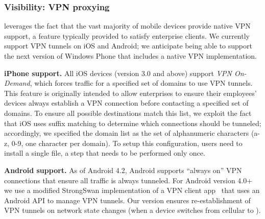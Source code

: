 %


\subsubsection{Visibility: VPN proxying}
\label{subsec:design_visibility}

\meddle leverages the fact that the vast majority of mobile devices provide native VPN support, a feature typically provided to satisfy enterprise clients. We currently support VPN tunnels on iOS and Android; we anticipate being able to support the next version of Windows Phone that includes a native VPN implementation.

\noindent\textbf{iPhone support.} 
All iOS devices (version 3.0 and above) support \textit{VPN On-Demand}, which forces traffic for a specified set of domains to use VPN tunnels. 
This feature is originally intended to allow enterprises to ensure their employees' devices always establish a VPN connection before contacting a specified set of domains. 
To ensure all possible destinations match this list, we exploit the fact that iOS uses suffix matching to determine which connections should be tunneled; accordingly, we specified the domain list as the set of alphanumeric characters (a-z, 0-9, one character per domain). 
To setup this configuration, users need to install a single file, a step that needs to be performed only once. 

\noindent\textbf{Android support.} As of Android 4.2, Android supports ``always on'' VPN connections that ensure all traffic is always tunneled.
For Android version 4.0+ we use a modified StrongSwan implementation of a VPN client app~\cite{strongswanclient}  that 
uses an Android API to manage VPN tunnels. 
Our version ensures re-establishment of VPN tunnels on network state changes (\eg when a device switches from cellular to \wifi).

